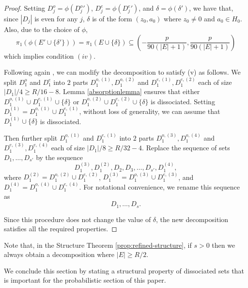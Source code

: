 \documentclass[11pt]{amsart}
\theoremstyle{definition}
\begin{document}
\begin{proof}
Setting $D_j^o=\phi({D_j^o}')$, $D_j^e=\phi({D_j^e}')$, and $\delta=\phi(\delta')$, we have that, since $|D_j|$ is even for any $j$, $\delta$ is of the form $(z_0,a_0)$ where $z_0\not=0$ and $a_0\in H_0$. Also, due to the choice of $\phi$, $$\pi_1(\phi(E' \cup \{\delta'\}))=\pi_1(E\cup\{\delta\}) \subseteq \left(-\frac{p}{90(|E|+1)},\frac{p}{90(|E|+1)}\right)$$ which implies condition $(iv)$.

Following again \cite{BK}, we can modify the decomposition to satisfy (v) as follows. We split $D_1^o$ and $D_1^e$ into $2$ parts $D_1^{o,(1)},D_1^{o,(2)}$ and  $D_1^{e,(1)},D_1^{e,(2)}$ each of size $|D_1|/4\geq R/16-8$. Lemma \ref{absorptionlemma} ensures that either $D_1^{o,(1)}\cup D_1^{e,(1)} \cup \{\delta\}$ or $D_1^{o,(2)}\cup D_1^{e,(2)}  \cup \{\delta\}$ is dissociated. Setting $D_1^{(1)}=D_1^{o,(1)}\cup D_1^{e,(1)}$, without loss of generality, we can assume that $D_1^{(1)}\cup \{\delta\}$ is dissociated.

Then further split $D_1^{o,(1)}$ and $D_1^{e,(1)}$ into $2$ parts $D_1^{o,(3)}, D_1^{o,(4)}$ and $D_1^{e,(3)}, D_1^{e,(4)}$ each of size $|D_1|/8\geq R/32-4$. Replace the sequence of sets $D_1, \ldots, D_{s'}$ by the sequence $$D_1^{(3)}, D_1^{(2)}, D_2, D_3, \ldots, D_{s'}, D_1^{(4)},$$ where $D_1^{(2)}=D_1^{o,(2)}\cup D_1^{e,(2)}$, $D_1^{(3)}=D_1^{o,(3)}\cup D_1^{e,(3)}$, and $D_1^{(4)}=D_1^{o,(4)}\cup D_1^{e,(4)}.$
For notational convenience, we rename this sequence as
$$D_1, \ldots, D_{s}.$$

Since this procedure does not change the value of $\delta$, the new decomposition satisfies all the required properties.
\end{proof}
Note that, in the Structure Theorem \ref{prop:refined-structure}, if $s>0$ then we always obtain a decomposition where $|E|\geq R/2$.

We conclude this section by stating a structural property of dissociated sets that is important for the probabilistic section of this paper.
\end{document}
